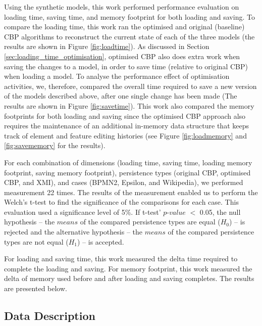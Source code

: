 {Using the synthetic models, this work performed performance evaluation on loading time, saving time, and memory footprint for both loading and saving. To compare the loading time, this work ran the optimised and original (baseline) CBP algorithms to reconstruct the current state of each of the three models (the results are shown in Figure \ref{fig:loadtime}). As discussed in Section \ref{sec:loading_time_optimisation}, optimised CBP also does extra work when saving the changes to a model, in order to save time (relative to original CBP) when loading a model. To analyse the performance effect of optimisation activities, we, therefore, compared the overall time required to save a new version of the models described above, after one single change has been made (The results are shown in Figure \ref{fig:savetime}). This work also compared the memory footprints for both loading and saving since the optimised CBP approach also requires the maintenance of an additional in-memory data structure that keeps track of element and feature editing histories (see Figure \ref{fig:loadmemory} and \ref{fig:savememory} for the results). 

For each combination of dimensions (loading time, saving time, loading memory footprint, saving memory footprint),  persistence types (original CBP, optimised CBP, and XMI), and cases (BPMN2, Epsilon, and Wikipedia), we performed measurement 22 times. The results of the measurement enabled us to perform the Welch's t-test \cite{welch1947ttest} to find the significance of the comparisons for each case. This evaluation used a significance level of 5\%. If t-test' $p$-$value$ $<$ 0.05, the null hypothesis -- the $means$ of the compared persistence types are equal ($H_0$) -- is rejected and the alternative hypothesis -- the $means$ of the compared persistence types are not equal ($H_1$) -- is accepted.

For loading and saving time, this work measured the delta time required to complete the loading and saving. For memory footprint, this work measured the delta of memory used before and after loading and saving completes. The results are presented below.

\subsection{Data Description}
\label{subsec:data_description}

}
